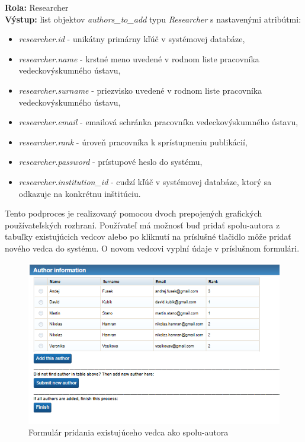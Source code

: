\documentclass[10pt,oneside,slovak,a4paper]{article}
\begin{document}
\textbf{Rola:} Researcher\\
\textbf{Výstup:} list objektov \textit{authors\_to\_add} typu \textit{Researcher} s nastavenými atribútmi:

\begin{itemize}
\item \textit{researcher.id} - unikátny primárny kľúč v systémovej databáze,
\item \textit{researcher.name} - krstné meno uvedené v rodnom liste pracovníka vedeckovýskumného ústavu,
\item \textit{researcher.surname} -  priezvisko uvedené v rodnom liste pracovníka vedeckovýskumného ústavu,
\item \textit{researcher.email} - emailová schránka pracovníka vedeckovýskumného ústavu,
\item \textit{researcher.rank} - úroveň pracovníka k sprístupneniu publikácií,
\item \textit{researcher.password} - prístupové heslo do systému,
\item \textit{researcher.institution\_id} - cudzí kľúč v systémovej databáze, ktorý sa odkazuje na konkrétnu inštitúciu.
\end{itemize}

Tento podproces je realizovaný pomocou dvoch prepojených grafických používateľských rozhraní. Používateľ má možnosť buď pridať spolu-autora z tabuľky existujúcich vedcov alebo po kliknutí na príslušné tlačidlo môže pridať nového vedca do systému. O novom vedcovi vyplní údaje v príslušnom formulári.

\begin{figure} [H]
\centering
\includegraphics[scale=0.4]{forms/add_existing_coauthor.png} 
\caption{Formulár pridania existujúceho vedca ako spolu-autora}
\end{figure}
\end{document}
